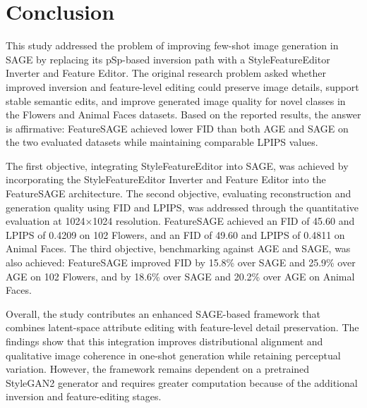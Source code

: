 \section{Conclusion}

This study addressed the problem of improving few-shot image generation in SAGE by replacing its pSp-based inversion path with a StyleFeatureEditor Inverter and Feature Editor. The original research problem asked whether improved inversion and feature-level editing could preserve image details, support stable semantic edits, and improve generated image quality for novel classes in the Flowers and Animal Faces datasets. Based on the reported results, the answer is affirmative: FeatureSAGE achieved lower FID than both AGE and SAGE on the two evaluated datasets while maintaining comparable LPIPS values.

The first objective, integrating StyleFeatureEditor into SAGE, was achieved by incorporating the StyleFeatureEditor Inverter and Feature Editor into the FeatureSAGE architecture. The second objective, evaluating reconstruction and generation quality using FID and LPIPS, was addressed through the quantitative evaluation at 1024$\times$1024 resolution. FeatureSAGE achieved an FID of 45.60 and LPIPS of 0.4209 on 102 Flowers, and an FID of 49.60 and LPIPS of 0.4811 on Animal Faces. The third objective, benchmarking against AGE and SAGE, was also achieved: FeatureSAGE improved FID by 15.8\% over SAGE and 25.9\% over AGE on 102 Flowers, and by 18.6\% over SAGE and 20.2\% over AGE on Animal Faces.

Overall, the study contributes an enhanced SAGE-based framework that combines latent-space attribute editing with feature-level detail preservation. The findings show that this integration improves distributional alignment and qualitative image coherence in one-shot generation while retaining perceptual variation. However, the framework remains dependent on a pretrained StyleGAN2 generator and requires greater computation because of the additional inversion and feature-editing stages.
